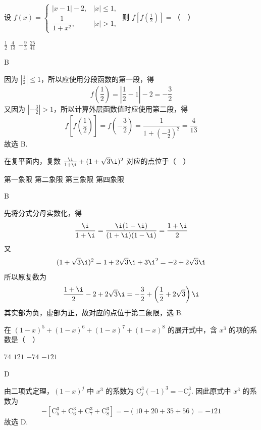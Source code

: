 \begin{problem}
设 \( f(x)=\begin{cases}
|x-1|-2, & |x|\leqslant1,\\
\dfrac{1}{1+x^{2}}, & |x|>1,
\end{cases} \) 则 \( f\left[f\left(\frac{1}{2}\right)\right]= \)（\(\quad\)）

\choices
    {\( \frac{1}{2} \)}
    {\( \frac{4}{13} \)}
    {\(-\frac{9}{5}\)}
    {\( \frac{25}{41} \)}

\begin{answer}
B
\end{answer}

\begin{solution}
因为 \(\left|\frac{1}{2}\right|\leqslant1\)，所以应使用分段函数的第一段，得
\[
f\left(\frac{1}{2}\right)=\left|\frac{1}{2}-1\right|-2=-\frac{3}{2}
\]
又因为 \(\left|-\frac{3}{2}\right|>1\)，所以计算外层函数值时应使用第二段，得
\[
f\left[f\left(\frac{1}{2}\right)\right]
=f\left(-\frac{3}{2}\right)
=\frac{1}{1+\left(-\frac{3}{2}\right)^2}
=\frac{4}{13}
\]
故选 B.
\end{solution}
\end{problem}

\begin{problem}
在复平面内，复数 \( \frac{\i}{1+\i} + (1 + \sqrt{3}\i)^{2} \) 对应的点位于（\(\quad\)）

\choices
    {第一象限}
    {第二象限}
    {第三象限}
    {第四象限}

\begin{answer}
B
\end{answer}

\begin{solution}
先将分式分母实数化，得
\[
\frac{\i}{1+\i}=\frac{\i(1-\i)}{(1+\i)(1-\i)}=\frac{1+\i}{2}
\]
又
\[
(1+\sqrt{3}\i)^2=1+2\sqrt{3}\i+3\i^2=-2+2\sqrt{3}\i
\]
所以原复数为
\[
\frac{1+\i}{2}-2+2\sqrt{3}\i
=-\frac{3}{2}+\left(\frac{1}{2}+2\sqrt{3}\right)\i
\]
其实部为负，虚部为正，故对应的点位于第二象限，选 B.
\end{solution}
\end{problem}

\begin{problem}
在 \((1 - x)^{5} + (1 - x)^{6} + (1 - x)^{7} + (1 - x)^{8}\) 的展开式中，含 \(x^{3}\) 的项的系数是（\(\quad\)）

\choices
    {\(74\)}
    {\(121\)}
    {\(-74\)}
    {\(-121\)}

\begin{answer}
D
\end{answer}

\begin{solution}
由二项式定理，\((1-x)^j\) 中 \(x^3\) 的系数为
\(\mathrm C_j^3(-1)^3=-\mathrm C_j^3\). 因此原式中 \(x^3\) 的系数为
\[
-\left[\mathrm C_5^3+\mathrm C_6^3+\mathrm C_7^3+\mathrm C_8^3\right]
=-(10+20+35+56)=-121
\]
故选 D.
\end{solution}
\end{problem}

